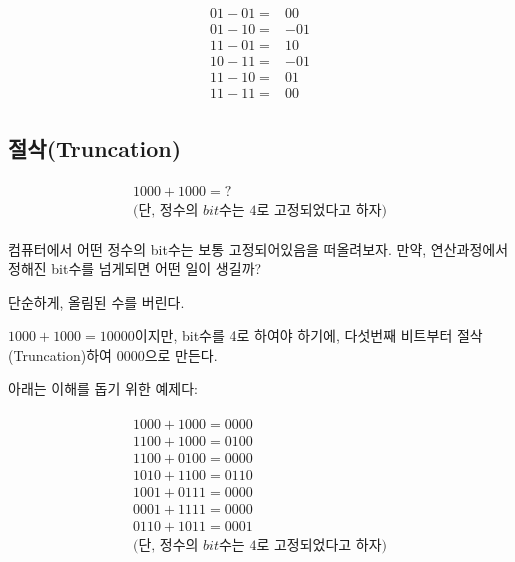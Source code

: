 \documentclass[a4paper,12pt]{book}
\begin{document}
\begin{appendices}
    \begin{align}
    \begin{split}
        01 - 01 =& 00 \\
        01 - 10 =& -01 \\
        11 - 01 =& 10 \\
        10 - 11 =& -01 \\
        11 - 10 =& 01 \\
        11 - 11 =& 00
    \end{split}
    \end{align}


    \subsection{절삭(Truncation)}

        \begin{align}
            \begin{split}
                1000 + 1000 = ? \\
                \textit{(단, 정수의 bit수는 4로 고정되었다고 하자)}
            \end{split}
        \end{align}


        컴퓨터에서 어떤 정수의 bit수는 보통 고정되어있음을 떠올려보자.
        만약, 연산과정에서 정해진 bit수를 넘게되면 어떤 일이 생길까?

        단순하게, 올림된 수를 버린다.

        $1000 + 1000 = 10000$이지만, bit수를 4로 하여야 하기에,
        다섯번째 비트부터 절삭(Truncation)하여 $0000$으로 만든다.

        아래는 이해를 돕기 위한 예제다:

        \begin{align}
            \begin{split}
                1000 + 1000 = 0000 \\
                1100 + 1000 = 0100 \\
                1100 + 0100 = 0000 \\
                1010 + 1100 = 0110 \\
                1001 + 0111 = 0000 \\
                0001 + 1111 = 0000 \\
                0110 + 1011 = 0001 \\
                \textit{(단, 정수의 bit수는 4로 고정되었다고 하자)}
            \end{split}
        \end{align}


\end{appendices}
\end{document}
